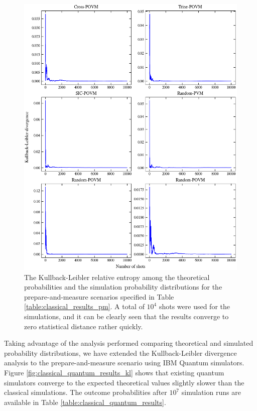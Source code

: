 \begin{figure}[h!]
\centering
\includegraphics[width=\textwidth]{images/pm_povm_kl.png}
\caption{The Kullback-Leibler relative entropy among the theoretical probabilities and the simulation probability distributions for the prepare-and-measure scenarios specified in Table \ref{table:classical_results_pm}. A total of $10^4$ shots were used for the simulations, and it can be clearly seen that the results converge to zero statistical distance rather quickly.}
\label{fig:classical_results_kl}
\end{figure}

Taking advantage of the analysis performed comparing theoretical and simulated probability distributions, we have extended the Kullback-Leibler divergence analysis to the prepare-and-measure scenario using IBM Quantum simulators. Figure \ref{fig:classical_quantum_results_kl} shows that existing quantum simulators converge to the expected theoretical values slightly slower than the classical simulations. The outcome probabilities after $10^7$ simulation runs are available in Table \ref{table:classical_quantum_results}.

